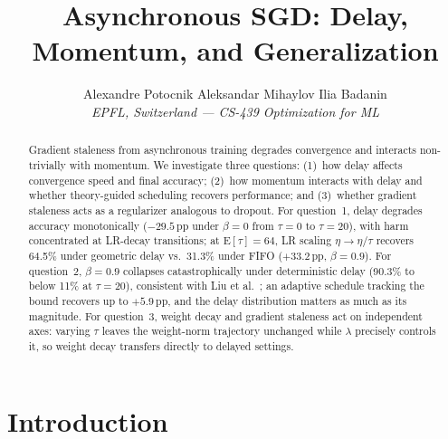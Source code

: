 \documentclass[10pt,conference,compsocconf]{IEEEtran}
\begin{document}
\title{Asynchronous SGD: Delay, Momentum, and Generalization}

\author{
  Alexandre Potocnik \quad Aleksandar Mihaylov \quad Ilia Badanin \\
  \textit{EPFL, Switzerland --- CS-439 Optimization for ML}
}

\maketitle

\begin{abstract}
Gradient staleness from asynchronous training degrades convergence and
interacts non-trivially with momentum.
We investigate three questions: (1)~how delay affects convergence speed
and final accuracy; (2)~how momentum interacts with delay and whether
theory-guided scheduling recovers performance; and (3)~whether gradient
staleness acts as a regularizer analogous to dropout.
For question~1, delay degrades accuracy monotonically ($-29.5$\,pp under
$\beta{=}0$ from $\tau{=}0$ to $\tau{=}20$), with harm concentrated at
LR-decay transitions; at $\mathrm{E}[\tau]{=}64$, LR scaling
$\eta \to \eta/\tau$ recovers 64.5\% under geometric delay vs.\ 31.3\%
under FIFO ($+33.2$\,pp, $\beta{=}0.9$).
For question~2, $\beta{=}0.9$ collapses catastrophically under deterministic
delay (90.3\% to below 11\% at $\tau{=}20$), consistent with Liu et
al.~\cite{liu2018momentum}; an adaptive schedule tracking the bound recovers
up to $+5.9$\,pp, and the delay distribution matters as much as its magnitude.
For question~3, weight decay and gradient staleness act on independent axes:
varying $\tau$ leaves the weight-norm trajectory unchanged while $\lambda$
precisely controls it, so weight decay transfers directly to delayed settings.
\end{abstract}

\section{Introduction}
\end{document}
